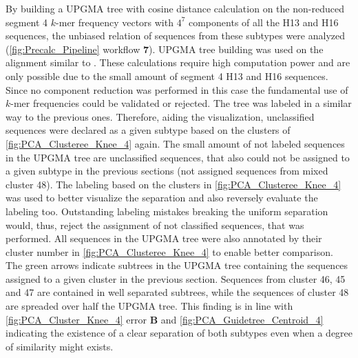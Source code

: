 \newpage

By building a \gls{UPGMA} tree with cosine distance calculation on the non-reduced segment 4 $k$-mer frequency vectors with $4^7$ components of all the H13 and H16 sequences, the unbiased relation of sequences from these subtypes were analyzed (\autoref{fig:Precalc_Pipeline} workflow \textsf{\textbf{7}}). \gls{UPGMA} tree building was used on the alignment similar to \textcite{moss_identification_2011}. These calculations require high computation power and are only possible due to the small amount of segment 4 H13 and H16 sequences. Since no component reduction was performed in this case the fundamental use of $k$-mer frequencies could be validated or rejected. The tree was labeled in a similar way to the previous ones. Therefore, aiding the visualization, unclassified sequences were declared as a given subtype based on the clusters of \autoref{fig:PCA_Clusteree_Knee_4} again. The small amount of not labeled sequences in the \gls{UPGMA} tree are unclassified sequences, that also could not be assigned to a given subtype in the previous sections (not assigned sequences from mixed cluster 48). The labeling based on the clusters in \autoref{fig:PCA_Clusteree_Knee_4} was used to better visualize the separation and also reversely evaluate the labeling too. Outstanding labeling mistakes breaking the uniform separation would, thus, reject the assignment of not classified sequences, that was performed. All sequences in the \gls{UPGMA} tree were also annotated by their cluster number in \autoref{fig:PCA_Clusteree_Knee_4} to enable better comparison. The green arrows indicate subtrees in the \gls{UPGMA} tree containing the sequences assigned to a given cluster in the previous section. Sequences from cluster 46, 45 and 47 are contained in well separated subtrees, while the sequences of cluster 48 are spreaded over half the \gls{UPGMA} tree. This finding is in line with \autoref{fig:PCA_Cluster_Knee_4} error \textbf{\textsf{B}} and \autoref{fig:PCA_Guidetree_Centroid_4} indicating the existence of a clear separation of both subtypes even when a degree of similarity might exists.

